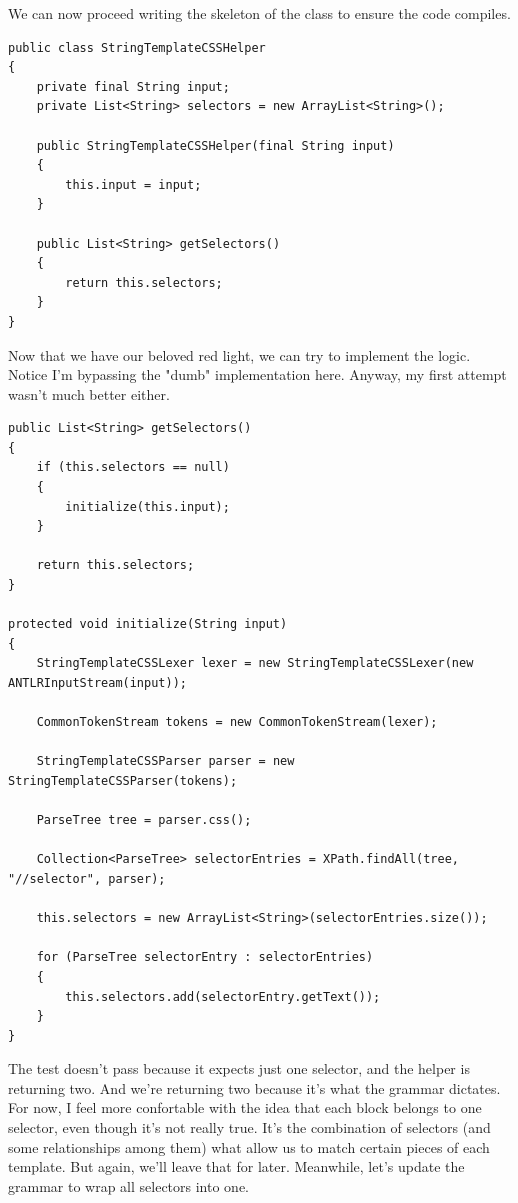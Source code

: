 \documentclass[11pt]{article}
\begin{document}
We can now proceed writing the skeleton of the class to ensure the code compiles.

\begin{verbatim}
public class StringTemplateCSSHelper
{
    private final String input;
    private List<String> selectors = new ArrayList<String>();

    public StringTemplateCSSHelper(final String input)
    {
        this.input = input;
    }

    public List<String> getSelectors()
    {
        return this.selectors;
    }
}
\end{verbatim}

Now that we have our beloved red light, we can try to implement the logic. Notice I'm bypassing the "dumb" implementation here. Anyway, my first attempt wasn't much better either.

\begin{verbatim}
public List<String> getSelectors()
{
    if (this.selectors == null)
    {
        initialize(this.input);
    }

    return this.selectors;
}

protected void initialize(String input)
{
    StringTemplateCSSLexer lexer = new StringTemplateCSSLexer(new ANTLRInputStream(input));

    CommonTokenStream tokens = new CommonTokenStream(lexer);

    StringTemplateCSSParser parser = new StringTemplateCSSParser(tokens);

    ParseTree tree = parser.css();

    Collection<ParseTree> selectorEntries = XPath.findAll(tree, "//selector", parser);

    this.selectors = new ArrayList<String>(selectorEntries.size());

    for (ParseTree selectorEntry : selectorEntries)
    {
        this.selectors.add(selectorEntry.getText());
    }
}
\end{verbatim}

The test doesn't pass because it expects just one selector, and the helper is returning two. And we're returning two
because it's what the grammar dictates. For now, I feel more confortable with the idea that each block belongs
to one selector, even though it's not really true. It's the combination of selectors (and some relationships among them) what allow us
to match certain pieces of each template. But again, we'll leave that for later. Meanwhile, let's update the grammar to
wrap all selectors into one.
\end{document}
